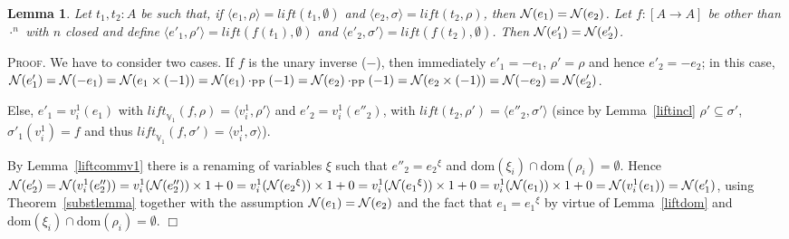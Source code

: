 \documentclass{article}
\newtheorem{lemma}[definition]{Lemma}
\newenvironment{proof}{\smallskip\textsc{Proof.}}{\hspace*{\fill}$\Box$}
\newcommand{\N}{{\cal N}}
\newcommand{\V}{{\mathbb V}}
\newcommand{\liftv}[1]{\ensuremath{\mathit{lift}_{\V_{#1}}}}
\newcommand{\lift}{\ensuremath{\mathit{lift}}}
\newcommand{\dom}{\ensuremath{\mathrm{dom}}}
\newcommand{\renamevar}[2]{\ensuremath{{#1}^{#2}}}
\newcommand{\isrenamevar}[3]{\ensuremath{{#1}=\renamevar{#2}{#3}}}
\newcommand{\multPP}{\ensuremath{\cdot_{\mathrm{PP}}}}
\begin{document}
\begin{lemma}\label{set4}
Let $t_1,t_2:A$ be such that, if $\langle e_1,\rho\rangle=\lift(t_1,\emptyset)$
and $\langle e_2,\sigma\rangle=\lift(t_2,\rho)$, then $\N(e_1)=\N(e_2)$.
Let $f:[A\to A]$ be other than $\cdot^n$ with $n$ closed and define
$\langle e'_1,\rho'\rangle=\lift(f(t_1),\emptyset)$ and
$\langle e'_2,\sigma'\rangle=\lift(f(t_2),\emptyset)$.
Then $\N(e'_1)=\N(e'_2)$.
\end{lemma}
\begin{proof}
We have to consider two cases.  If $f$ is the unary inverse ($-$), then
immediately $e'_1=-e_1$, $\rho'=\rho$ and hence $e'_2=-e_2$; in this case,
$\N(e'_1)=\N(-e_1)=\N(e_1\times(-1))=\N(e_1)\multPP(-1)=\N(e_2)\multPP(-1)=%
\N(e_2\times(-1))=\N(-e_2)=\N(e'_2)$.

Else, $e'_1=v^1_i(e_1)$ with $\liftv1(f,\rho)=\langle v^1_i,\rho'\rangle$
and $e'_2=v^1_i(e''_2)$, with $\lift(t_2,\rho')=\langle e''_2,\sigma'\rangle$
(since by Lemma~\ref{liftincl} $\rho'\subseteq\sigma'$, $\sigma'_1(v^1_i)=f$
and thus $\liftv1(f,\sigma')=\langle v^1_i,\sigma\rangle$).

By Lemma~\ref{liftcommv1} there is a renaming of variables $\xi$ such
that {\isrenamevar{e''_2}{e_2}\xi} and $\dom(\xi_i)\cap\dom(\rho_i)=\emptyset$.
Hence
$\N(e'_2)%
=\N(v^1_i(e''_2))%
=v^1_i(\N(e''_2))\times1+0%
=v^1_i(\N(\renamevar{e_2}\xi))\times1+0%
=v^1_i(\N(\renamevar{e_1}\xi))\times1+0%
=v^1_i(\N(e_1))\times1+0%
=\N(v^1_i(e_1))%
=\N(e'_1)$,
using Theorem~\ref{substlemma} together with the assumption
$\N(e_1)=\N(e_2)$ and the fact that {\isrenamevar{e_1}{e_1}\xi} by
virtue of Lemma~\ref{liftdom} and
$\dom(\xi_i)\cap\dom(\rho_i)=\emptyset$.
\end{proof}
\end{document}

